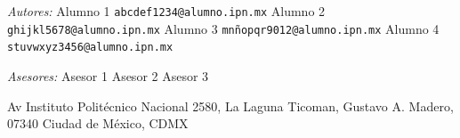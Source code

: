 \begin{center}
	
	\begin{minipage}{0.46\textwidth}
		\begin{flushleft} \large
			\emph{Autores:} \newline
			Alumno 1 \newline
			\texttt{abcdef1234@alumno.ipn.mx} \newline
			Alumno 2 \newline
			\texttt{ghijkl5678@alumno.ipn.mx} \newline
			Alumno 3 \newline
			\texttt{mnñopqr9012@alumno.ipn.mx} \newline
			Alumno 4 \newline
			\texttt{stuvwxyz3456@alumno.ipn.mx} \newline
		\end{flushleft}
	\end{minipage}
	\hfill
	\begin{minipage}{0.52\textwidth}
		\vspace{-0.6cm}
		\begin{flushright} \large
			\emph{Asesores:} \newline
			Asesor 1 \newline
			Asesor 2 \newline
			Asesor 3 \newline
		\end{flushright}
	\end{minipage}
	
	\begin{center}
		Av Instituto Politécnico Nacional 2580, La Laguna Ticoman, Gustavo A. Madero, 07340 Ciudad de México, CDMX
	\end{center}

\end{center}

